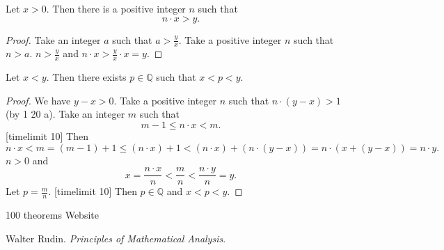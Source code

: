 \documentclass{article}
\begin{document}
\begin{forthel}

\begin{theorem}[1 20 a]
Let $x > 0$.
Then there is a
positive integer $n$ such that \[ n \cdot x > y. \]
\end{theorem}
\begin{proof}
Take an integer $a$ such that $a > \frac{y}{x}$.
Take a positive integer $n$ such that $n > a$.
$n > \frac{y}{x}$ and $n \cdot x > \frac{y}{x} \cdot x = y$.
\end{proof}

\begin{theorem}[1 20 b]
Let $x < y$. Then there exists
$p \in \mathbb{Q}$ such that $x < p < y$.
\end{theorem}
\begin{proof}
We have $y - x > 0$.
Take a positive integer $n$ such that
$n\cdot (y-x) > 1$ (by 1 20 a).
Take an integer $m$ such that
\[ m -1 \leq n \cdot x < m. \]
[timelimit 10]
Then
\[ n \cdot x < m = (m - 1) + 1 \leq (n\cdot x) + 1 <
(n\cdot x) + (n\cdot (y-x)) = n \cdot (x + (y - x)) = n \cdot y. \]
$n > 0$ and
\[ x = \frac{n\cdot x}{n} < \frac{m}{n} < \frac{n\cdot y}{n} = y. \]
Let $p = \frac{m}{n}$. 
[timelimit 10]
Then $p \in \mathbb{Q}$ and $x < p < y$.
\end{proof}

\end{forthel}


\begin{thebibliography}{plain}
 100 theorems
 Website

 Walter Rudin. \textit{Principles of Mathematical
Analysis}.
\end{thebibliography}
\end{document}
